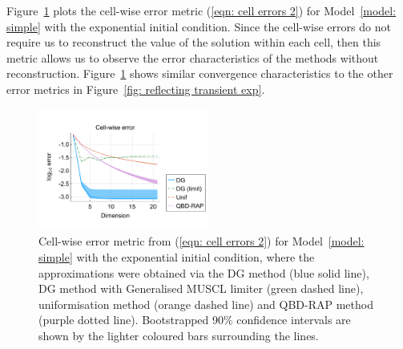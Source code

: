 Figure~\ref{fig: reflecting transient exp cp} plots the cell-wise error metric (\ref{eqn: cell errors 2}) for Model~\ref{model: simple} with the exponential initial condition. Since the cell-wise errors do not require us to reconstruct the value of the solution within each cell, then this metric allows us to observe the error characteristics of the methods without reconstruction. Figure~\ref{fig: reflecting transient exp cp} shows similar convergence characteristics to the other error metrics in Figure~\ref{fig: reflecting transient exp}. 
\begin{figure}[h]
	\centering
	\includegraphics[width=0.5\textwidth,trim={0.75cm 0.8cm 0.25cm 1.25cm},clip]{chapter6/figs/hitting_times_model/reflecting_model/transient_distribution/exp/L1_cell_probs_error_formatted.pdf}
	\caption{Cell-wise error metric from (\ref{eqn: cell errors 2}) for Model~\ref{model: simple} with the exponential initial condition, where the approximations were obtained via the DG method (blue solid line), DG method with Generalised MUSCL limiter (green dashed line), uniformisation method (orange dashed line) and QBD-RAP method (purple dotted line). Bootstrapped 90\% confidence intervals are shown by the lighter coloured bars surrounding the lines.} 
	\label{fig: reflecting transient exp cp} 
\end{figure}
\exampleFloatBarrier
